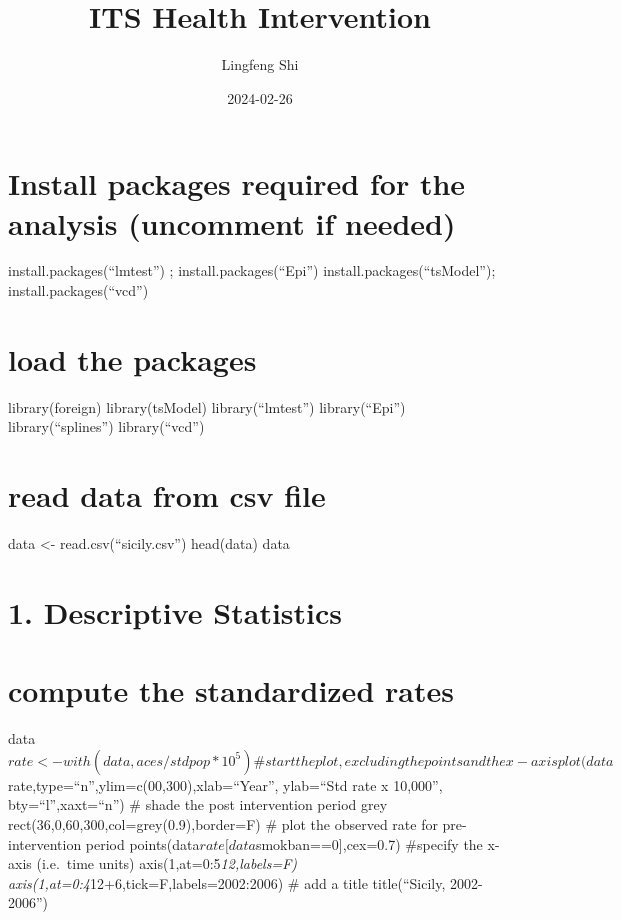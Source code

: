 \documentclass[
]{article}
\title{ITS Health Intervention}
\author{Lingfeng Shi}
\date{2024-02-26}
\begin{document}
\maketitle

\hypertarget{install-packages-required-for-the-analysis-uncomment-if-needed}{%
\section{Install packages required for the analysis (uncomment if
needed)}\label{install-packages-required-for-the-analysis-uncomment-if-needed}}

install.packages(``lmtest'') ; install.packages(``Epi'')
install.packages(``tsModel''); install.packages(``vcd'')

\hypertarget{load-the-packages}{%
\section{load the packages}\label{load-the-packages}}

library(foreign) library(tsModel) library(``lmtest'') library(``Epi'')
library(``splines'') library(``vcd'')

\hypertarget{read-data-from-csv-file}{%
\section{read data from csv file}\label{read-data-from-csv-file}}

data \textless- read.csv(``sicily.csv'') head(data) data

\hypertarget{descriptive-statistics}{%
\section{1. Descriptive Statistics}\label{descriptive-statistics}}

\hypertarget{compute-the-standardized-rates}{%
\section{compute the standardized
rates}\label{compute-the-standardized-rates}}

data\(rate <- with(data, aces/stdpop*10^5) \# start the plot, excluding the points and the x-axis 
plot(data\)rate,type=``n'',ylim=c(00,300),xlab=``Year'',
ylab=``Std rate x 10,000'', bty=``l'',xaxt=``n'') \# shade the post
intervention period grey rect(36,0,60,300,col=grey(0.9),border=F) \#
plot the observed rate for pre-intervention period
points(data\(rate[data\)smokban==0{]},cex=0.7) \#specify the x-axis
(i.e.~time units) axis(1,at=0:5\emph{12,labels=F)
axis(1,at=0:4}12+6,tick=F,labels=2002:2006) \# add a title
title(``Sicily, 2002-2006'')
\end{document}
